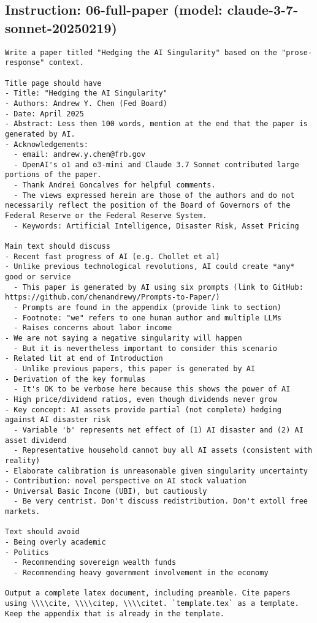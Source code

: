 \subsection*{Instruction: 06-full-paper  (model: claude-3-7-sonnet-20250219)}
\vspace{-1ex}
\begin{lstlisting}[language=text,breaklines=true,frame=single]
Write a paper titled "Hedging the AI Singularity" based on the "prose-response" context.

Title page should have
- Title: "Hedging the AI Singularity"
- Authors: Andrew Y. Chen (Fed Board)
- Date: April 2025
- Abstract: Less then 100 words, mention at the end that the paper is generated by AI.
- Acknowledgements: 
  - email: andrew.y.chen@frb.gov
  - OpenAI's o1 and o3-mini and Claude 3.7 Sonnet contributed large portions of the paper.
  - Thank Andrei Goncalves for helpful comments.
  - The views expressed herein are those of the authors and do not necessarily reflect the position of the Board of Governors of the Federal Reserve or the Federal Reserve System.
  - Keywords: Artificial Intelligence, Disaster Risk, Asset Pricing

Main text should discuss
- Recent fast progress of AI (e.g. Chollet et al)
- Unlike previous technological revolutions, AI could create *any* good or service
  - This paper is generated by AI using six prompts (link to GitHub: https://github.com/chenandrewy/Prompts-to-Paper/)
  - Prompts are found in the appendix (provide link to section)
  - Footnote: "we" refers to one human author and multiple LLMs
  - Raises concerns about labor income
- We are not saying a negative singularity will happen
  - But it is nevertheless important to consider this scenario        
- Related lit at end of Introduction
  - Unlike previous papers, this paper is generated by AI
- Derivation of the key formulas
  - It's OK to be verbose here because this shows the power of AI
- High price/dividend ratios, even though dividends never grow
- Key concept: AI assets provide partial (not complete) hedging against AI disaster risk
  - Variable 'b' represents net effect of (1) AI disaster and (2) AI asset dividend
  - Representative household cannot buy all AI assets (consistent with reality)
- Elaborate calibration is unreasonable given singularity uncertainty
- Contribution: novel perspective on AI stock valuation
- Universal Basic Income (UBI), but cautiously
  - Be very centrist. Don't discuss redistribution. Don't extoll free markets.

Text should avoid      
- Being overly academic
- Politics
  - Recommending sovereign wealth funds
  - Recommending heavy government involvement in the economy

Output a complete latex document, including preamble. Cite papers using \\\\cite, \\\\citep, \\\\citet. `template.tex` as a template. Keep the appendix that is already in the template.

\end{lstlisting}
\vspace{-3ex}